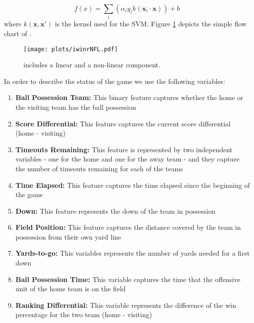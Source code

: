 \begin{equation}
f(x) = \sum_{i} (\alpha_i y_i k(\mathbf{x}_i\cdot\mathbf{x}))+ b
\label{eq:svm}
\end{equation}
where $k(\mathbf{x},\mathbf{x}')$ is the kernel used for the SVM.   
Figure \ref{fig:iwinrNFL} depicts the simple flow chart of {\method}. 


\begin{figure}[t]
\begin{center}
\texttt{[image: plots/iwinrNFL.pdf]}%
 \caption{{\method} includes a linear and a non-linear component.}
 \label{fig:iwinrNFL}
\end{center}
\end{figure}

In order to describe the status of the game we use the following variables:

\begin{enumerate}
\item {\bf Ball Possession Team:} This binary feature captures whether the home or the visiting team has the ball possession
\item {\bf Score Differential:} This feature captures the current score differential (home - visiting)
\item {\bf Timeouts Remaining:} This feature is represented by two independent variables - one for the home and one for the away team - and they capture the number of timeouts remaining for each of the teams
\item {\bf Time Elapsed: } This feature captures the time elapsed since the beginning of the game
\item {\bf Down:} This feature represents the down of the team in possession
\item {\bf Field Position:} This feature captures the distance covered by the team in possession from their own yard line
\item {\bf Yards-to-go:} This variables represents the number of yards needed for a first down
\item {\bf Ball Possession Time: } This variable captures the time that the offensive unit of the home team is on the field 
\item {\bf Ranking Differential: } This variable represents the difference of the win percentage for the two team (home - visiting)
\end{enumerate}

